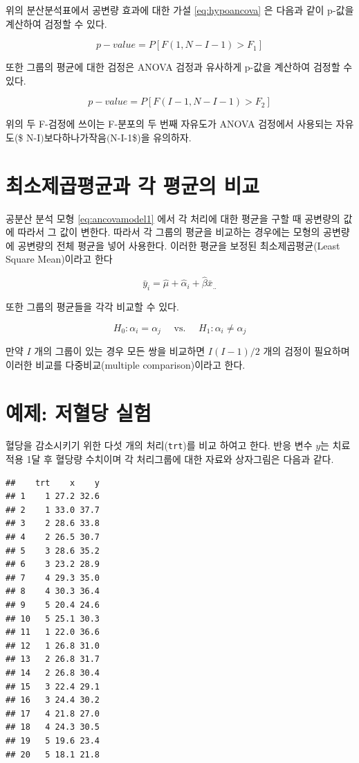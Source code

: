 \documentclass[
  10pt,
]{book}
\theoremstyle{definition}
\theoremstyle{definition}
\theoremstyle{definition}
\theoremstyle{definition}
\theoremstyle{remark}
\begin{document}
위의 분산분석표에서 공변량 효과에 대한 가설 \eqref{eq:hypoancova} 은 다음과 같이 p-값을 계산하여 검정할 수 있다.

\[ p-value = P[ F(1, N-I-1) > F_1 ] \]

또한 그룹의 평균에 대한 검정은 ANOVA 검정과 유사하게 p-값을 계산하여 검정할 수 있다.

\[ p-value = P[ F(I-1, N-I-1) > F_2 ] \]

위의 두 F-검정에 쓰이는 F-분포의 두 번째 자유도가 ANOVA 검정에서
사용되는 자유도(\$ N-I\()보다 하나가 작음(\)N-I-1\$)을 유의하자.

\hypertarget{uxcd5cuxc18cuxc81cuxacf1uxd3c9uxade0uxacfc-uxac01-uxd3c9uxade0uxc758-uxbe44uxad50}{%
\section{최소제곱평균과 각 평균의 비교}\label{uxcd5cuxc18cuxc81cuxacf1uxd3c9uxade0uxacfc-uxac01-uxd3c9uxade0uxc758-uxbe44uxad50}}

공분산 분석 모형 \eqref{eq:ancovamodel1} 에서 각 처리에 대한 평균을 구할 때
공변량의 값에 따라서 그 값이 변한다. 따라서 각 그룹의 평균을 비교하는 경우에는 모형의 공변량에 공변량의 전체 평균을 넣어 사용한다. 이러한 평균을 보정된 최소제곱평균(Least Square Mean)이라고 한다

\[ \bar y_i = \hat \mu + \hat \alpha_i + \hat \beta \bar x_{..} \]

또한 그룹의 평균들을 각각 비교할 수 있다.

\[ H_0: \alpha_i =\alpha_j \quad \text{ vs. } \quad  H_1:\alpha_i  \ne \alpha_j  \]

만약 \(I\) 개의 그룹이 있는 경우 모든 쌍을 비교하면 \(I(I-1)/2\) 개의 검정이 필요하며 이러한 비교를 다중비교(multiple comparison)이라고 한다.

\hypertarget{uxc608uxc81c-uxc800uxd608uxb2f9-uxc2e4uxd5d8}{%
\section{예제: 저혈당 실험}\label{uxc608uxc81c-uxc800uxd608uxb2f9-uxc2e4uxd5d8}}

혈당을 감소시키기 위한 다섯 개의 처리(\texttt{trt})를 비교 하여고 한다. 반응 변수 \(y\)는 치료 적용 1달 후 혈당량 수치이며 각 처리그룹에 대한 자료와 상자그림은 다음과 같다.

\begin{verbatim}
##    trt    x    y
## 1    1 27.2 32.6
## 2    1 33.0 37.7
## 3    2 28.6 33.8
## 4    2 26.5 30.7
## 5    3 28.6 35.2
## 6    3 23.2 28.9
## 7    4 29.3 35.0
## 8    4 30.3 36.4
## 9    5 20.4 24.6
## 10   5 25.1 30.3
## 11   1 22.0 36.6
## 12   1 26.8 31.0
## 13   2 26.8 31.7
## 14   2 26.8 30.4
## 15   3 22.4 29.1
## 16   3 24.4 30.2
## 17   4 21.8 27.0
## 18   4 24.3 30.5
## 19   5 19.6 23.4
## 20   5 18.1 21.8
\end{verbatim}
\end{document}
